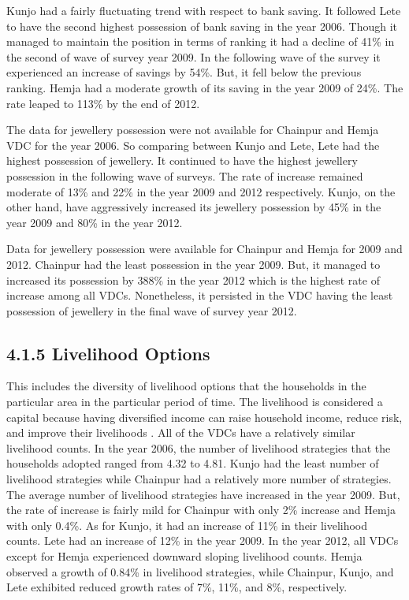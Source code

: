 \documentclass[12pt, a4paper]{article}
\begin{document}
Kunjo had a fairly fluctuating trend with respect to bank saving. It followed Lete to have the second highest possession of bank saving in the year 2006. Though it managed to maintain the position in terms of ranking it had a decline of 41\% in the second of wave of survey year 2009. In the following wave of the survey it experienced an increase of savings by 54\%. But, it fell below the previous ranking. Hemja had a moderate growth of its saving in the year 2009 of 24\%. The rate leaped to 113\% by the end of 2012.     

The data for jewellery possession were not available for Chainpur and Hemja VDC for the year 2006. So comparing between Kunjo and Lete, Lete had the highest possession of jewellery. It continued to have the highest jewellery possession in the following wave of surveys. The rate of increase remained moderate of 13\% and 22\% in the year 2009 and 2012 respectively. Kunjo, on the other hand, have aggressively increased its jewellery possession by 45\% in the year 2009 and 80\% in the year 2012. 

Data for jewellery possession were available for Chainpur and Hemja for 2009 and 2012. Chainpur had the least possession in the year 2009. But, it managed to increased its possession by 388\% in the year 2012 which is the highest rate of increase among all VDCs. Nonetheless, it persisted in the VDC having the least possession of jewellery in the final wave of survey year 2012.  

 
 \subsection*{4.1.5 Livelihood Options} 
 This includes the diversity of livelihood options that the households in the particular area in the particular period of time. The livelihood is considered a capital because having diversified income can raise household income, reduce risk, and improve their livelihoods \citep{scoones2013livelihoods}. All of the VDCs have a relatively similar livelihood counts. In the year 2006, the number of livelihood strategies that the households adopted ranged from 4.32 to 4.81. Kunjo had the least number of livelihood strategies while Chainpur had a relatively more number of strategies. The average number of livelihood strategies have increased in the year 2009. But, the rate of increase is fairly mild for Chainpur with only 2\% increase and Hemja with only 0.4\%.  As for Kunjo, it had an increase of 11\% in their livelihood counts. Lete had an increase of 12\% in the year 2009. In the year 2012, all VDCs except for Hemja experienced downward sloping livelihood counts. Hemja observed a growth of 0.84\% in livelihood strategies, while Chainpur, Kunjo, and Lete exhibited reduced growth rates of 7\%, 11\%, and 8\%, respectively. 
\end{document}
